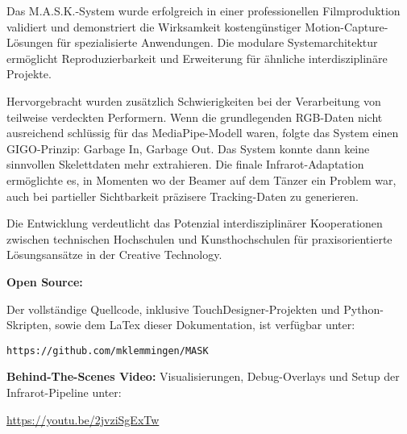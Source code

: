 Das M.A.S.K.-System wurde erfolgreich in einer professionellen Filmproduktion validiert und demonstriert die Wirksamkeit kostengünstiger Motion-Capture-Lösungen für spezialisierte Anwendungen. Die modulare Systemarchitektur ermöglicht Reproduzierbarkeit und Erweiterung für ähnliche interdisziplinäre Projekte.

Hervorgebracht wurden zusätzlich Schwierigkeiten bei der Verarbeitung von teilweise verdeckten Performern. Wenn die grundlegenden RGB-Daten nicht ausreichend schlüssig für das MediaPipe-Modell waren, folgte das System einen GIGO-Prinzip: Garbage In, Garbage Out. Das System konnte dann keine sinnvollen Skelettdaten mehr extrahieren. Die finale Infrarot-Adaptation ermöglichte es, in Momenten wo der Beamer auf dem Tänzer ein Problem war, auch bei partieller Sichtbarkeit präzisere Tracking-Daten zu generieren.

Die Entwicklung verdeutlicht das Potenzial interdisziplinärer Kooperationen zwischen technischen Hochschulen und Kunsthochschulen für praxisorientierte Lösungsansätze in der Creative Technology.

\textbf{Open Source:} \raggedright Der vollständige Quellcode, inklusive TouchDesigner-Projekten und Python-Skripten, sowie dem LaTex dieser Dokumentation, ist verfügbar unter:

\texttt{https://github.com/mklemmingen/MASK}

\textbf{Behind-The-Scenes Video:} Visualisierungen, Debug-Overlays und Setup der Infrarot-Pipeline unter:

\url{https://youtu.be/2jvziSgExTw}